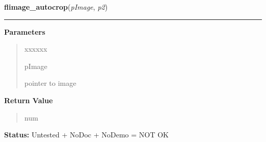 \hspace{.8\funcindent}\begin{boxedminipage}{\funcwidth}

    \raggedright \textbf{flimage\_autocrop}(\textit{pImage}, \textit{p2})

    \vspace{-1.5ex}

    \rule{\textwidth}{0.5\fboxrule}
\setlength{\parskip}{2ex}
\setlength{\parskip}{1ex}
      \textbf{Parameters}
      \vspace{-1ex}

      \begin{quote}
        \begin{Ventry}{xxxxxx}

          \item[pImage]

          pointer to image

        \end{Ventry}

      \end{quote}

      \textbf{Return Value}
    \vspace{-1ex}

      \begin{quote}
      num

      \end{quote}

\textbf{Status:} Untested + NoDoc + NoDemo = NOT OK



    \end{boxedminipage}

    \label{xformslib:library:flimage_get_autocrop}

    \vspace{0.5ex}

